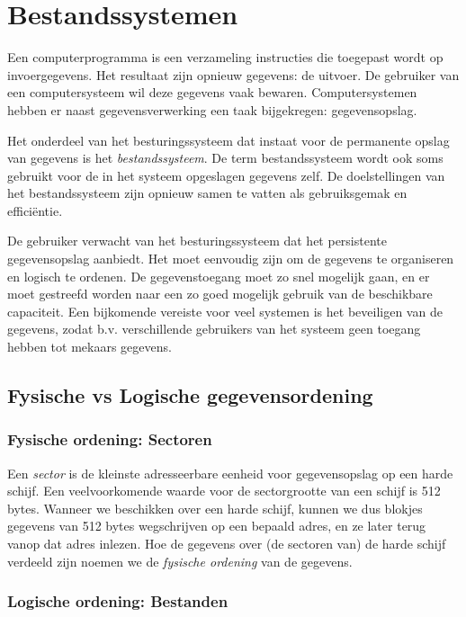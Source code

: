 \chapter{Bestandssystemen}

Een computerprogramma is een verzameling instructies die toegepast
wordt op invoergegevens. Het resultaat zijn opnieuw gegevens: de uitvoer.
De gebruiker van een computersysteem wil deze gegevens vaak bewaren.
Computersystemen hebben er naast gegevensverwerking een taak bijgekregen:
gegevensopslag.

Het onderdeel van het besturingssysteem dat instaat voor de
permanente opslag van gegevens is het
\emph{bestandssysteem}. De term bestandssysteem wordt ook
soms gebruikt voor de in het systeem opgeslagen gegevens zelf. De
doelstellingen van het bestandssysteem zijn opnieuw samen te vatten als
gebruiksgemak en effici\"entie.

De gebruiker verwacht van het besturingssysteem dat het persistente
gegevensopslag aanbiedt. Het moet eenvoudig zijn om de gegevens te
organiseren en logisch te ordenen. De gegevenstoegang moet zo snel
mogelijk gaan, en er moet gestreefd worden naar een zo goed mogelijk
gebruik van de beschikbare capaciteit. Een bijkomende vereiste voor veel
systemen is het beveiligen van de gegevens, zodat b.v. verschillende
gebruikers van het systeem geen toegang hebben tot mekaars
gegevens.

\section{Fysische vs Logische gegevensordening}

\subsection{Fysische ordening: Sectoren}

Een \emph{sector} is de kleinste adresseerbare
eenheid voor gegevensopslag op een harde schijf. Een veelvoorkomende
waarde voor de sectorgrootte van een schijf is 512 bytes. Wanneer we
beschikken over een harde schijf, kunnen we dus blokjes gegevens van
512 bytes wegschrijven op een bepaald adres, en ze later terug vanop
dat adres inlezen. Hoe de gegevens over (de sectoren van) de harde
schijf verdeeld zijn noemen we de \emph{fysische
ordening} van de gegevens.

\subsection{Logische ordening: Bestanden}

